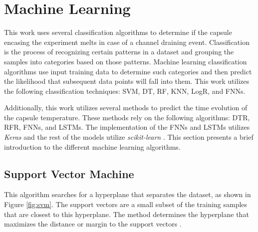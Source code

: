 




\section{Machine Learning}
\label{sec:ML}

This work uses several classification algorithms to determine if the capsule encasing the experiment melts in case of a channel draining event.
Classification is the process of recognizing certain patterns in a dataset and grouping the samples into categories based on those patterns.
Machine learning classification algorithms use input training data to determine such categories and then predict the likelihood that subsequent data points will fall into them.
This work utilizes the following classification techniques: \Gls*{SVM}, \Gls*{DT}, \Gls*{RF}, \Gls*{KNN}, \Gls*{LogR}, and \Glspl*{FNN}.

Additionally, this work utilizes several methods to predict the time evolution of the capsule temperature.
These methods rely on the following algorithms: \Gls*{DTR}, \Gls*{RFR}, \Glspl*{FNN}, and \Glspl*{LSTM}.
The implementation of the FNNs and LSTMs utilizes \textit{Keras} \cite{chollet_keras_2015} and the rest of the models
utilize \textit{scikit-learn} \cite{pedregosa_scikit-learn_2011}.
This section presents a brief introduction to the different machine learning algorithms.


\subsection{Support Vector Machine}


This algorithm searches for a hyperplane that separates the dataset, as shown in Figure \ref{fig:svm}.
The support vectors are a small subset of the training samples that are closest to this hyperplane.
The method determines the hyperplane that maximizes the distance or margin to the support vectors \cite{pedregosa_scikit-learn_2011}.

